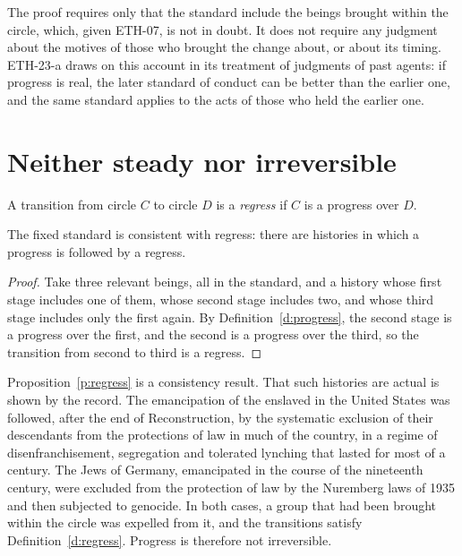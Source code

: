 \documentclass{situationist-preprint}
\begin{document}
The proof requires only that the standard include the beings brought within the circle, which, given ETH-07, is not in doubt. It does not require any judgment about the motives of those who brought the change about, or about its timing. ETH-23-a draws on this account in its treatment of judgments of past agents: if progress is real, the later standard of conduct can be better than the earlier one, and the same standard applies to the acts of those who held the earlier one.

\section{Neither steady nor irreversible}

\begin{definition}[Regress]\label{d:regress}
A transition from circle $C$ to circle $D$ is a \emph{regress} if $C$ is a progress over $D$.
\end{definition}

\begin{proposition}\label{p:regress}
The fixed standard is consistent with regress: there are histories in which a progress is followed by a regress.
\end{proposition}

\begin{proof}
Take three relevant beings, all in the standard, and a history whose first stage includes one of them, whose second stage includes two, and whose third stage includes only the first again. By Definition~\ref{d:progress}, the second stage is a progress over the first, and the second is a progress over the third, so the transition from second to third is a regress.
\end{proof}

Proposition~\ref{p:regress} is a consistency result. That such histories are actual is shown by the record. The emancipation of the enslaved in the United States was followed, after the end of Reconstruction, by the systematic exclusion of their descendants from the protections of law in much of the country, in a regime of disenfranchisement, segregation and tolerated lynching that lasted for most of a century. The Jews of Germany, emancipated in the course of the nineteenth century, were excluded from the protection of law by the Nuremberg laws of 1935 and then subjected to genocide. In both cases, a group that had been brought within the circle was expelled from it, and the transitions satisfy Definition~\ref{d:regress}. Progress is therefore not irreversible.
\end{document}
